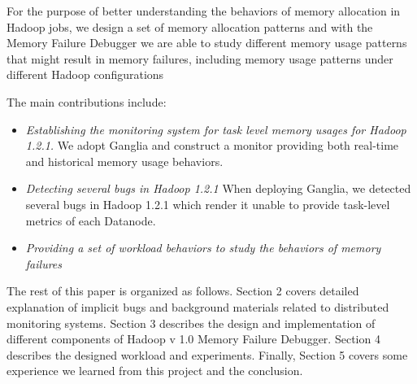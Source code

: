 \par
For the purpose of better understanding the behaviors of memory allocation in Hadoop jobs, we design a set of memory allocation patterns and with the Memory Failure Debugger we are able to study different memory usage patterns that might result in memory failures, including memory usage patterns under different Hadoop configurations
\par
The main contributions include:
\begin{itemize}
	\setlength{\itemsep}{1pt}
	 \setlength{\parskip}{0pt}
	 \setlength{\parsep}{0pt}
	\item
		\emph{ Establishing the monitoring system for task level memory usages for Hadoop 1.2.1.} We adopt Ganglia and construct a monitor providing both real-time and historical memory usage behaviors.
	\item
		\emph{ Detecting several bugs in Hadoop 1.2.1} When deploying Ganglia, we detected several bugs in Hadoop 1.2.1 which render it unable to provide task-level metrics of each Datanode.
	\item
		\emph{ Providing a set of workload behaviors to study the behaviors of memory failures} 
\end{itemize}

The rest of this paper is organized as follows. Section 2 covers detailed explanation of implicit bugs and background materials related to distributed monitoring systems. Section 3 describes the design and implementation of different components of Hadoop v 1.0 Memory Failure Debugger. Section 4 describes the designed workload and experiments. Finally, Section 5 covers some experience we learned from this project and the conclusion.


